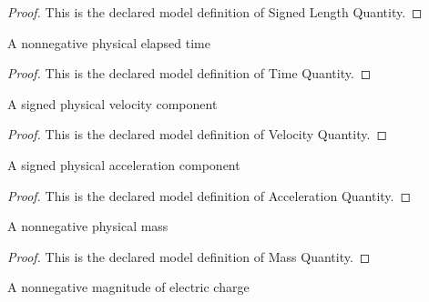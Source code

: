 \begin{proof}
  This is the declared model definition of Signed Length Quantity.
\end{proof}
\begin{definition}
  \label{def:physics:phyx-mini-0838:phyxminiproblems-problemphyxmini0838-timequantity}
  A nonnegative physical elapsed time
\end{definition}
\begin{proof}
  This is the declared model definition of Time Quantity.
\end{proof}
\begin{definition}
  \label{def:physics:phyx-mini-0838:phyxminiproblems-problemphyxmini0838-velocityquantity}
  A signed physical velocity component
\end{definition}
\begin{proof}
  This is the declared model definition of Velocity Quantity.
\end{proof}
\begin{definition}
  \label{def:physics:phyx-mini-0838:phyxminiproblems-problemphyxmini0838-accelerationquantity}
  A signed physical acceleration component
\end{definition}
\begin{proof}
  This is the declared model definition of Acceleration Quantity.
\end{proof}
\begin{definition}
  \label{def:physics:phyx-mini-0838:phyxminiproblems-problemphyxmini0838-massquantity}
  A nonnegative physical mass
\end{definition}
\begin{proof}
  This is the declared model definition of Mass Quantity.
\end{proof}
\begin{definition}
  \label{def:physics:phyx-mini-0838:phyxminiproblems-problemphyxmini0838-chargemagnitudequantity}
  A nonnegative magnitude of electric charge
\end{definition}
